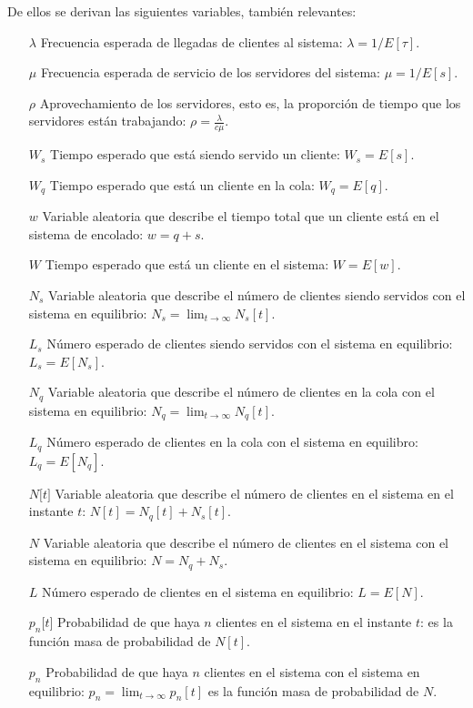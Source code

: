 \documentclass[a4paper,10pt]{scrartcl}
\numberwithin{equation}{section}
\begin{document}
De ellos se derivan las siguientes variables, también relevantes:
\begin{itemize}
\item [$\lambda$]
  Frecuencia esperada de llegadas de clientes al sistema: $\lambda = 1/E[\tau]$.
\item [$\mu$]
  Frecuencia esperada de servicio de los servidores del sistema: $\mu = 1/E[s]$.
\item [$\rho$]
  Aprovechamiento de los servidores, esto es, la proporción de tiempo que los servidores están trabajando: $\rho = \frac{\lambda}{c\mu}$.
\item [$W_s$]
  Tiempo esperado que está siendo servido un cliente: $W_s  = E[s]$.
\item [$W_q$]
  Tiempo esperado que está un cliente en la cola: $W_q = E[q]$.
\item [$w$]
  Variable aleatoria que describe el tiempo total que un cliente está en el sistema de encolado: $w = q+s$.
\item [$W$]
  Tiempo esperado que está un cliente en el sistema: $W = E[w]$.
\item [$N_s$]
  Variable aleatoria que describe el número de clientes siendo servidos con el sistema en equilibrio: $N_s = \lim_{t \rightarrow \infty} N_s[t]$.
\item [$L_s$]
  Número esperado de clientes siendo servidos con el sistema en equilibrio: $L_s = E[N_s]$.
\item [$N_q$]
  Variable aleatoria que describe el número de clientes en la cola con el sistema en equilibrio: $N_q = \lim_{t \rightarrow \infty} N_q[t]$.
\item [$L_q$]
  Número esperado de clientes en la cola con el sistema en equilibro: $L_q = E[N_q]$.
\item [$N \lbrack t \rbrack$]
  Variable aleatoria que describe el número de clientes en el sistema en el instante $t$: $N[t] = N_q[t]+N_s[t]$.
\item [$N$]
  Variable aleatoria que describe el número de clientes en el sistema con el sistema en equilibrio: $N = N_q+N_s$.
\item [$L$]
  Número esperado de clientes en el sistema en equilibrio: $L = E[N]$.
\item [$p_n \lbrack t \rbrack$]
  Probabilidad de que haya $n$ clientes en el sistema en el instante $t$: es la función masa de probabilidad de $N[t]$.
\item [$p_n$]
  Probabilidad de que haya $n$ clientes en el sistema con el sistema en equilibrio: $p_n = \lim_{t \rightarrow \infty} p_n[t]$ es la función masa de probabilidad de $N$.
\end{itemize}
\end{document}
